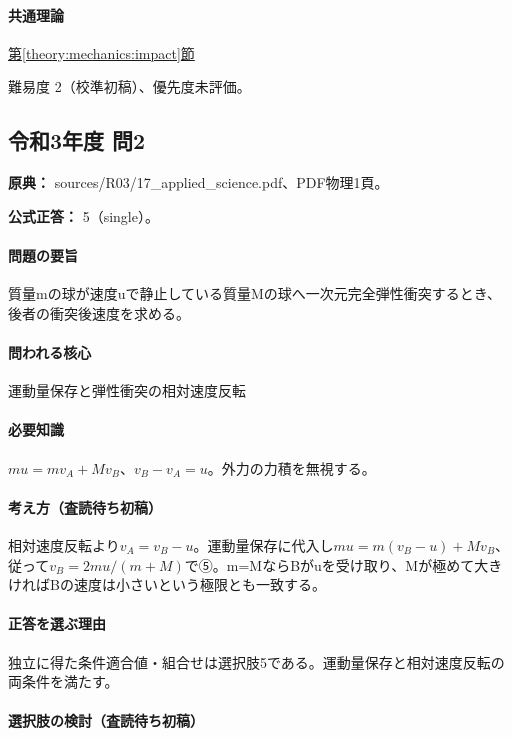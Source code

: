 \paragraph{共通理論} \hyperref[theory:mechanics:impact]{第\ref*{theory:mechanics:impact}節}

\par 難易度 2（校準初稿）、優先度未評価。

\subsection{令和3年度 問2}
\label{q:r03-reg-applied-02}

\noindent\textbf{原典：} sources/R03/17\_applied\_science.pdf、PDF物理1頁。

\textbf{公式正答：} 5（single）。

\paragraph{問題の要旨} 質量mの球が速度uで静止している質量Mの球へ一次元完全弾性衝突するとき、後者の衝突後速度を求める。

\paragraph{問われる核心} 運動量保存と弾性衝突の相対速度反転

\paragraph{必要知識} \(mu=mv_A+Mv_B\)、\(v_B-v_A=u\)。外力の力積を無視する。

\paragraph{考え方（査読待ち初稿）} 相対速度反転より\(v_A=v_B-u\)。運動量保存に代入し\(mu=m(v_B-u)+Mv_B\)、従って\(v_B=2mu/(m+M)\)で⑤。m=\allowbreak{}MならBがuを受け取り、Mが極めて大きければBの速度は小さいという極限とも一致する。

\paragraph{正答を選ぶ理由} 独立に得た条件適合値・組合せは選択肢5である。運動量保存と相対速度反転の両条件を満たす。

\paragraph{選択肢の検討（査読待ち初稿）}\mbox{}\par

